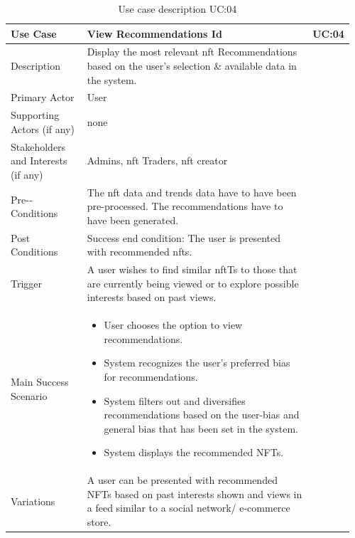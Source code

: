 \vspace{-4mm}
\begin{longtable}{|p{0.23\linewidth}|p{0.73\linewidth}|}
\caption{Use case description UC:04}\\ 
\hline
Use Case & View Recommendations \endfirsthead 
\hline
Id & UC:04 \\ 
\hline
Description & Display the most relevant \gls{nft} Recommendations based on the user's selection \& available data in the system. \\ 
\hline
Primary Actor & User \\ 
\hline
Supporting Actors (if any) & none \\ 
\hline
Stakeholders and Interests (if any) & Admins, \gls{nft} Traders, \gls{nft} creator \\ 
\hline
Pre-‐Conditions & The \gls{nft} data and trends data have to have been pre-processed. The recommendations have to have been generated. \\ 
\hline
Post Conditions & Success end condition: The user is presented with recommended \gls{nft}s. \\ 
\hline
Trigger & A user wishes to find similar \gls{nft}Ts to those that are currently being viewed or to explore possible interests based on past views. \\ 
\hline
Main Success Scenario & 
\vspace{-7mm}       %
\begin{itemize}[leftmargin=*]
\item User chooses the option to view recommendations.
\item System recognizes the user's preferred bias for recommendations.
\item System filters out and diversifies recommendations based on the user-bias and general bias that has been set in the system.
\item System displays the recommended NFTs. 
\end{itemize}
\vspace{-7mm}       %
\\ 
\hline
Variations & A user can be presented with recommended NFTs based on past interests shown and views in a feed similar to a social network/ e-commerce store. \\
\hline
\end{longtable}

